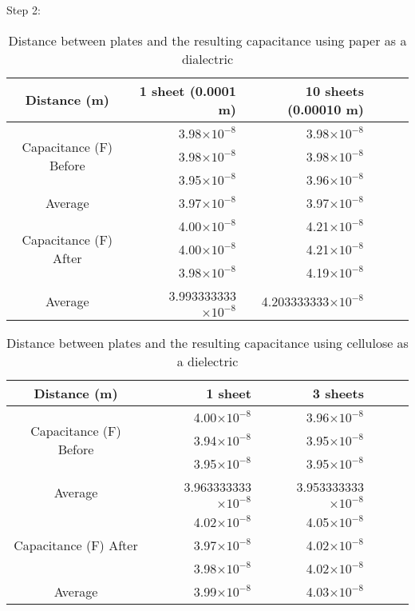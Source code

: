 \documentclass [12pt, letterpaper, twoside] {article}
\begin{document}
Step 2:
\begin{table}[h!]
  \centering
  \begin{tabular}{| c | r | r | r | r | r |}
    \hline\hline
    Distance (m) & 1 sheet (0.0001 m) & 10 sheets (0.00010 m) \\
    \hline
    \multirow {3}{*}{Capacitance (F) Before} & 3.98\(\times10^{-8}\) & 3.98\(\times10^{-8}\) \\
    & 3.98\(\times10^{-8}\) & 3.98\(\times10^{-8}\) \\
    & 3.95\(\times10^{-8}\) & 3.96\(\times10^{-8}\) \\
    \hline
    Average & 3.97\(\times10^{-8}\) & 3.97\(\times10^{-8}\) \\
    \hline
    \multirow {3}{*}{Capacitance (F) After} & 4.00\(\times10^{-8}\) & 4.21\(\times10^{-8}\) \\
    & 4.00\(\times10^{-8}\) & 4.21\(\times10^{-8}\) \\
    & 3.98\(\times10^{-8}\) & 4.19\(\times10^{-8}\) \\
    \hline
    Average & 3.993333333\(\times10^{-8}\) & 4.203333333\(\times10^{-8}\) \\
    \hline\hline
  \end{tabular}
  \caption{Distance between plates and the resulting capacitance using paper as a dialectric}
\end{table}

\begin{table}[h!]
  \centering
  \begin{tabular}{| c | r | r | r | r | r |}
    \hline\hline
    Distance (m) & 1 sheet & 3 sheets \\
    \hline
    \multirow {3}{*}{Capacitance (F) Before} & 4.00\(\times10^{-8}\) & 3.96\(\times10^{-8}\) \\
    & 3.94\(\times10^{-8}\) & 3.95\(\times10^{-8}\) \\
    & 3.95\(\times10^{-8}\) & 3.95\(\times10^{-8}\) \\
    \hline
    Average & 3.963333333\(\times10^{-8}\) & 3.953333333\(\times10^{-8}\) \\
    \hline
    \multirow {3}{*}{Capacitance (F) After} & 4.02\(\times10^{-8}\) & 4.05\(\times10^{-8}\) \\
    & 3.97\(\times10^{-8}\) & 4.02\(\times10^{-8}\) \\
    & 3.98\(\times10^{-8}\) & 4.02\(\times10^{-8}\) \\
    \hline
    Average & 3.99\(\times10^{-8}\) & 4.03\(\times10^{-8}\) \\
    \hline\hline
  \end{tabular}
  \caption{Distance between plates and the resulting capacitance using cellulose as a dielectric}
\end{table}
\end{document}
